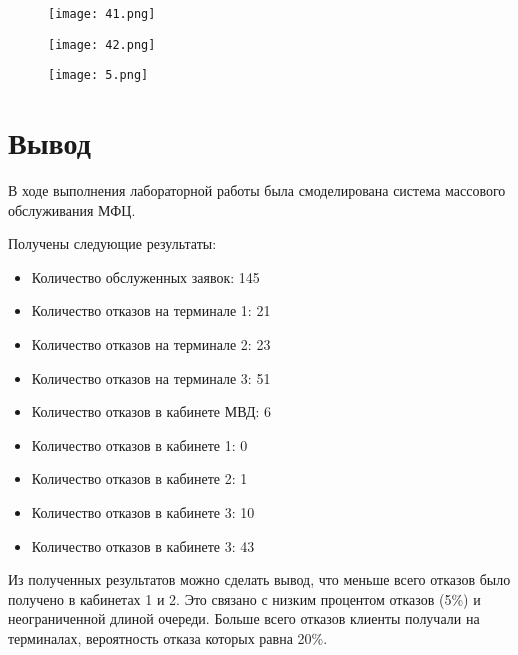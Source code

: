 \documentclass[a4paper,fontsize=12bp]{extreport}
\begin{document}
\begin{figure}[H]
    \texttt{[image: 41.png]}
    \label{fig:4}
\end{figure}

\begin{figure}[H]
    \texttt{[image: 42.png]}
    \label{fig:4}
\end{figure}

\begin{figure}[H]
    \texttt{[image: 5.png]}
    \label{fig:5}
\end{figure}


\section*{Вывод}
В ходе выполнения лабораторной работы была смоделирована система массового обслуживания МФЦ. 

Получены следующие результаты:

\begin{itemize}
\item Количество обслуженных заявок: 145
\item Количество отказов на терминале 1: 21 
\item Количество отказов на терминале 2: 23
\item Количество отказов на терминале 3: 51
\item Количество отказов в кабинете МВД: 6
\item Количество отказов в кабинете 1: 0
\item Количество отказов в кабинете 2: 1
\item Количество отказов в кабинете 3: 10
\item Количество отказов в кабинете 3: 43
\end{itemize}

Из полученных результатов можно сделать вывод, что меньше всего отказов было получено в кабинетах 1 и 2. Это связано с низким процентом отказов (5\%) и неограниченной длиной очереди. 
Больше всего отказов клиенты получали на терминалах, вероятность отказа которых равна 20\%.
\end{document}
